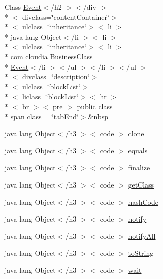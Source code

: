 \begin{DoxyCompactItemize}
 Class \hyperlink{index-5_8html_a25cf9659160eb47e6daacdaf21baa4be}{Event}$<$/h2 $>$$<$/div $>$\\*
$<$ divclass=\char`\"{}content\-Container\char`\"{}$>$\\*
$<$ ulclass=\char`\"{}inheritance\char`\"{}$>$$<$ li $>$\\*
 java lang Object$<$/li $>$$<$ li $>$\\*
$<$ ulclass=\char`\"{}inheritance\char`\"{}$>$$<$ li $>$\\*
 com cloudia Business\-Class \\*
\hyperlink{index-5_8html_a25cf9659160eb47e6daacdaf21baa4be}{Event}$<$/li $>$$<$/ul $>$$<$/li $>$$<$/ul $>$\\*
$<$ divclass=\char`\"{}description\char`\"{}$>$\\*
$<$ ulclass=\char`\"{}block\-List\char`\"{}$>$\\*
$<$ liclass=\char`\"{}block\-List\char`\"{}$>$$<$ hr $>$\\*
$<$ br $>$$<$ pre $>$ public class \\*
\hyperlink{stylesheet_8css_a8343996ebcf16220b04e54659aac31cc}{span} \hyperlink{_event_8html_ace38be72fd372cf33b7fbf5144e168aa}{class} = \char`\"{}tab\-End\char`\"{}$>$\&nbsp
\item 
java lang Object$<$/h3 $>$$<$ code $>$ \hyperlink{_event_8html_adc9607fcabf6f2d7f401ad52015ef6e0}{clone}
\item 
java lang Object$<$/h3 $>$$<$ code $>$ \hyperlink{_event_8html_a8974318cea585f72df717e0380ec7104}{equals}
\item 
java lang Object$<$/h3 $>$$<$ code $>$ \hyperlink{_event_8html_ab2315181ead4aeedef2374039b6ddde7}{finalize}
\item 
java lang Object$<$/h3 $>$$<$ code $>$ \hyperlink{_event_8html_a98e6644727fe65eac217a6855045be43}{get\-Class}
\item 
java lang Object$<$/h3 $>$$<$ code $>$ \hyperlink{_event_8html_a8e178e2bb2bef055ea23ea3910a221ca}{hash\-Code}
\item 
java lang Object$<$/h3 $>$$<$ code $>$ \hyperlink{_event_8html_ae99ae10b5010594dbda4794e02db271b}{notify}
\item 
java lang Object$<$/h3 $>$$<$ code $>$ \hyperlink{_event_8html_a1279357e6e09e33e75b55eb05fdb6436}{notify\-All}
\item 
java lang Object$<$/h3 $>$$<$ code $>$ \hyperlink{_event_8html_a36e8a76a4132c9a7081416f27d087615}{to\-String}
\item 
java lang Object$<$/h3 $>$$<$ code $>$ \hyperlink{_event_8html_a9a9f0c22e5688d478c707f910f1c1aea}{wait}
\end{DoxyCompactItemize}


